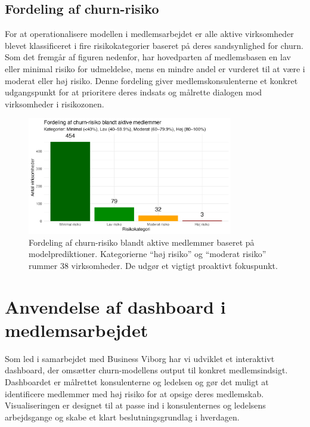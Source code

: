\documentclass[
  11pt,
  letterpaper,
  DIV=11,
  numbers=noendperiod]{scrartcl}
\begin{document}
\subsection{Fordeling af churn-risiko}\label{fordeling-af-churn-risiko}

For at operationalisere modellen i medlemsarbejdet er alle aktive
virksomheder blevet klassificeret i fire risikokategorier baseret på
deres sandsynlighed for churn. Som det fremgår af figuren nedenfor, har
hovedparten af medlemsbasen en lav eller minimal risiko for udmeldelse,
mens en mindre andel er vurderet til at være i moderat eller høj risiko.
Denne fordeling giver medlemskonsulenterne et konkret udgangspunkt for
at prioritere deres indsats og målrette dialogen mod virksomheder i
risikozonen.

\begin{figure}[H]

{\centering \includegraphics[width=0.8\textwidth,height=\textheight]{images/9_churn_risikokategorier_aktive.png}

}

\caption{Fordeling af churn-risiko blandt aktive medlemmer baseret på
modelprediktioner. Kategorierne ``høj risiko'' og ``moderat risiko''
rummer 38 virksomheder. De udgør et vigtigt proaktivt fokuspunkt.}

\end{figure}%

\section{Anvendelse af dashboard i
medlemsarbejdet}\label{anvendelse-af-dashboard-i-medlemsarbejdet}

Som led i samarbejdet med Business Viborg har vi udviklet et interaktivt
dashboard, der omsætter churn-modellens output til konkret
medlemsindsigt. Dashboardet er målrettet konsulenterne og ledelsen og
gør det muligt at identificere medlemmer med høj risiko for at opsige
deres medlemskab. Visualiseringen er designet til at passe ind i
konsulenternes og ledelsens arbejdsgange og skabe et klart
beslutningsgrundlag i hverdagen.
\end{document}
